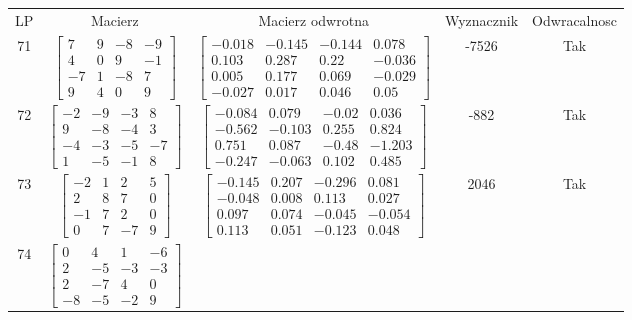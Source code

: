 \documentclass[a4paper,12pt]{article}
\begin{document}
\bgroup {} \vspace{0.2in} \begin{tabular}{c c c c c}
LP & Macierz & Macierz odwrotna & Wyznacznik & Odwracalnosc\\
71
&
$\begin{bmatrix} 7 & 9 & -8 & -9 \\ 4 & 0 & 9 & -1 \\ -7 & 1 & -8 & 7 \\ 9 & 4 & 0 & 9 \end{bmatrix}$
&
$\begin{bmatrix} -0.018 & -0.145 & -0.144 & 0.078 \\ 0.103 & 0.287 & 0.22 & -0.036 \\ 0.005 & 0.177 & 0.069 & -0.029 \\ -0.027 & 0.017 & 0.046 & 0.05 \end{bmatrix}$
&
-7526
&
Tak
\\
72
&
$\begin{bmatrix} -2 & -9 & -3 & 8 \\ 9 & -8 & -4 & 3 \\ -4 & -3 & -5 & -7 \\ 1 & -5 & -1 & 8 \end{bmatrix}$
&
$\begin{bmatrix} -0.084 & 0.079 & -0.02 & 0.036 \\ -0.562 & -0.103 & 0.255 & 0.824 \\ 0.751 & 0.087 & -0.48 & -1.203 \\ -0.247 & -0.063 & 0.102 & 0.485 \end{bmatrix}$
&
-882
&
Tak
\\
73
&
$\begin{bmatrix} -2 & 1 & 2 & 5 \\ 2 & 8 & 7 & 0 \\ -1 & 7 & 2 & 0 \\ 0 & 7 & -7 & 9 \end{bmatrix}$
&
$\begin{bmatrix} -0.145 & 0.207 & -0.296 & 0.081 \\ -0.048 & 0.008 & 0.113 & 0.027 \\ 0.097 & 0.074 & -0.045 & -0.054 \\ 0.113 & 0.051 & -0.123 & 0.048 \end{bmatrix}$
&
2046
&
Tak
\\
74
&
$\begin{bmatrix} 0 & 4 & 1 & -6 \\ 2 & -5 & -3 & -3 \\ 2 & -7 & 4 & 0 \\ -8 & -5 & -2 & 9 \end{bmatrix}$

\end{tabular}
\end{document}
